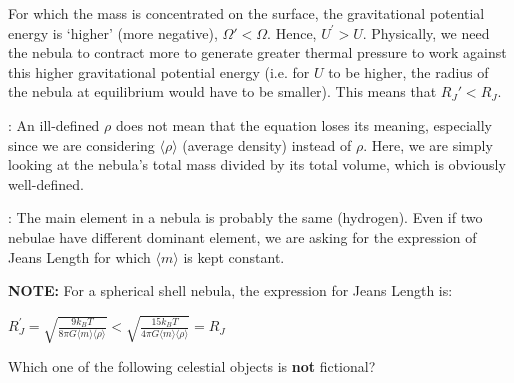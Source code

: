 \documentclass[a4paper,11pt]{exam}
\begin{document}
\begin{questions}
\begin{solution}
		For which the mass is concentrated on the surface, the gravitational potential energy is `higher' (more negative), $ \Omega' < \Omega $. Hence, $ U^\prime > U $. Physically, we need the nebula to contract more to generate greater thermal pressure to work against this higher gravitational potential energy (i.e. for $ U $ to be higher, the radius of the nebula at equilibrium would have to be smaller).  This means that $ R_{J}'< {R}_{J} $.

		: An ill-defined $ \rho $ does not mean that the equation loses its meaning, especially since we are considering $ \langle\rho\rangle $ (average density) instead of $ \rho $. Here, we are simply looking at the nebula's total mass divided by its total volume, which is obviously well-defined.

		: The main element in a nebula is probably the same (hydrogen). Even if two nebulae have different dominant element, we are asking for the expression of Jeans Length for which $ \langle m\rangle $ is kept constant.

		\textbf{NOTE:} For a spherical shell nebula, the expression for Jeans Length is:

		$\displaystyle R_J^\prime = \sqrt{\frac{9k_BT}{8\pi G\langle m\rangle\langle\rho\rangle}} < \sqrt{\frac{15k_BT}{4\pi G\langle m\rangle\langle\rho\rangle}}=R_J $
	\end{solution}

\filbreak
\question
	Which one of the following celestial objects is \textbf{not} fictional?


\end{questions}
\end{document}
